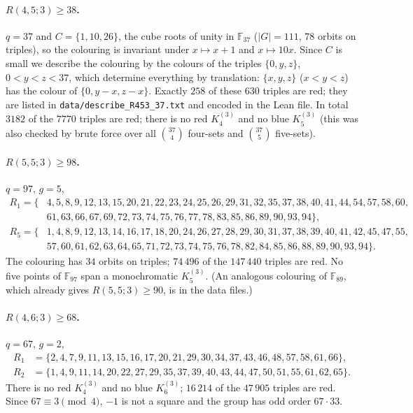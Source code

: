 \documentclass[11pt]{article}
\theoremstyle{definition}
\theoremstyle{remark}
\newcommand{\F}{\mathbb F}
\begin{document}
\paragraph{$R(4,5;3)\ge 38$.} $q=37$ and $C=\{1,10,26\}$, the cube roots of unity in $\F_{37}$
($|G|=111$, $78$ orbits on triples), so the colouring is invariant under $x\mapsto x+1$ and $x\mapsto 10x$. Since $C$ is small we describe the colouring by the colours of the
triples $\{0,y,z\}$, $0<y<z<37$, which determine everything by translation: $\{x,y,z\}$ ($x<y<z$) has the
colour of $\{0,y-x,z-x\}$. Exactly $258$ of these $630$ triples are red; they are listed in
\texttt{data/describe\_R453\_37.txt} and encoded in the Lean file. In total $3182$ of the $7770$ triples are
red; there is no red $K_4^{(3)}$ and no blue $K_5^{(3)}$ (this was also checked by brute force over all
$\binom{37}{4}$ four-sets and $\binom{37}{5}$ five-sets).

\paragraph{$R(5,5;3)\ge 98$.} $q=97$, $g=5$,
\begin{align*}
R_1=\{&4, 5, 8, 9, 12, 13, 15, 20, 21, 22, 23, 24, 25, 26, 29, 31, 32, 35, 37, 38, 40, 41, 44, 54, 57, 58, 60,\\
 &61, 63, 66, 67, 69, 72, 73, 74, 75, 76, 77, 78, 83, 85, 86, 89, 90, 93, 94\},\\
R_5=\{&1, 4, 8, 9, 12, 13, 14, 16, 17, 18, 20, 24, 26, 27, 28, 29, 30, 31, 37, 38, 39, 40, 41, 42, 45, 47, 55,\\
 &57, 60, 61, 62, 63, 64, 65, 71, 72, 73, 74, 75, 76, 78, 82, 84, 85, 86, 88, 89, 90, 93, 94\}.
\end{align*}
The colouring has $34$ orbits on triples; $74\,496$ of the $147\,440$ triples are red. No five points of
$\F_{97}$ span a monochromatic $K_5^{(3)}$. (An analogous colouring of $\F_{89}$, which already gives
$R(5,5;3)\ge 90$, is in the data files.)

\paragraph{$R(4,6;3)\ge 68$.} $q=67$, $g=2$,
\begin{align*}
R_1&=\{2, 4, 7, 9, 11, 13, 15, 16, 17, 20, 21, 29, 30, 34, 37, 43, 46, 48, 57, 58, 61, 66\},\\
R_2&=\{1, 4, 9, 11, 14, 20, 22, 27, 29, 35, 37, 39, 40, 43, 44, 47, 50, 51, 55, 61, 62, 65\}.
\end{align*}
There is no red $K_4^{(3)}$ and no blue $K_6^{(3)}$; $16\,214$ of the $47\,905$ triples are red. Since
$67\equiv 3\pmod 4$, $-1$ is not a square and the group has odd order $67\cdot 33$.
\end{document}

